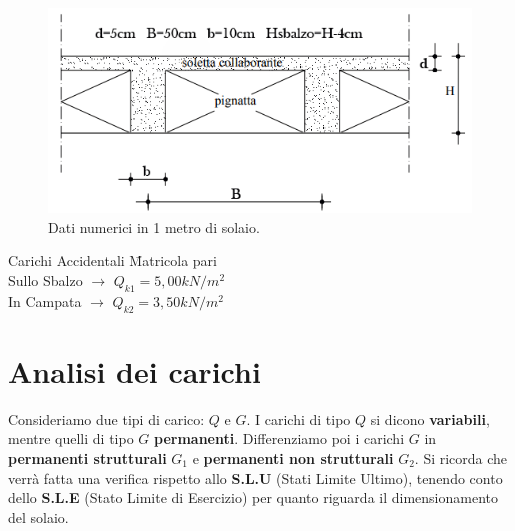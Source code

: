 \documentclass[a4paper,12pt, oneside]{book}
\begin{document}
	\begin{figure}[H]
		\hspace*{-.4cm}
		\centering
		\includegraphics[width=0.7\linewidth]{"immagini/misure solaio flessione normale"}
		\caption{Dati numerici in 1 metro di solaio.}
		\label{fig:misure-solaio-flessione-normale}
	\end{figure}
	
	\begin{tabbing}
		Carichi Accidentali \hspace{10em} \= Matricola pari \hspace{1em} \\
		Sullo Sbalzo $\longrightarrow$    \> $Q_{k1}=5,00kN/m^{2}$    \\
		In Campata   $\longrightarrow$    \> $Q_{k2}=3,50kN/m^{2}$                     
	\end{tabbing}
	\chapter{Analisi dei carichi}
	
	Consideriamo due tipi di carico: $Q$ e $G$. I carichi di tipo $Q$ si dicono \textbf{variabili}, mentre quelli di tipo $G$ \textbf{permanenti}. Differenziamo poi i carichi $G$ in \textbf{permanenti strutturali} $G_1$ e \textbf{permanenti non strutturali} $G_2$.
    \leavevmode\newline
    \leavevmode\newline
	Si ricorda che verrà fatta una verifica rispetto allo \textbf{S.L.U} (Stati Limite Ultimo), tenendo conto dello \textbf{S.L.E} (Stato Limite di Esercizio) per quanto riguarda il dimensionamento del solaio.
\end{document}
